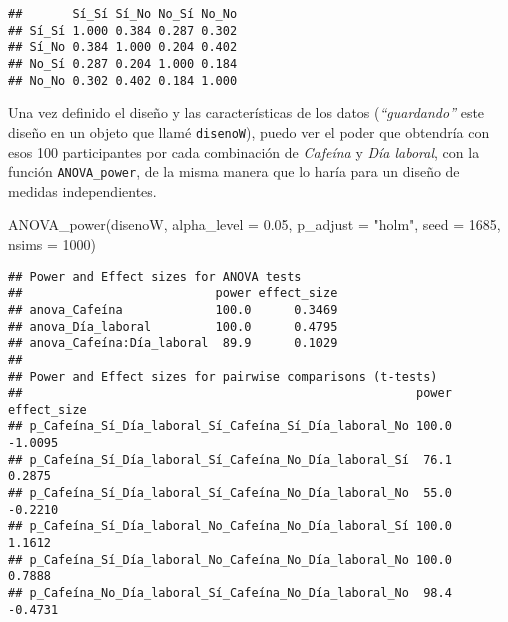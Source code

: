 \documentclass[
]{article}
\newenvironment{Shaded}{\begin{snugshade}}{\end{snugshade}}
\newcommand{\AttributeTok}[1]{\textcolor[rgb]{0.16,0.50,0.73}{#1}}
\newcommand{\DecValTok}[1]{\textcolor[rgb]{0.96,0.45,0.00}{#1}}
\newcommand{\FloatTok}[1]{\textcolor[rgb]{0.96,0.45,0.00}{#1}}
\newcommand{\FunctionTok}[1]{\textcolor[rgb]{0.56,0.27,0.68}{#1}}
\newcommand{\NormalTok}[1]{\textcolor[rgb]{0.81,0.81,0.76}{#1}}
\newcommand{\SpecialCharTok}[1]{\textcolor[rgb]{0.24,0.68,0.91}{#1}}
\newcommand{\StringTok}[1]{\textcolor[rgb]{0.96,0.31,0.31}{#1}}
\begin{document}
\begin{Shaded}
\end{Shaded}

\begin{verbatim}
##       Sí_Sí Sí_No No_Sí No_No
## Sí_Sí 1.000 0.384 0.287 0.302
## Sí_No 0.384 1.000 0.204 0.402
## No_Sí 0.287 0.204 1.000 0.184
## No_No 0.302 0.402 0.184 1.000
\end{verbatim}

Una vez definido el diseño y las características de los datos
(\emph{``guardando''} este diseño en un objeto que llamé
\texttt{disenoW}), puedo ver el poder que obtendría con esos 100
participantes por cada combinación de \emph{Cafeína} y \emph{Día
laboral}, con la función \texttt{ANOVA\_power}, de la misma manera que
lo haría para un diseño de medidas independientes.

\begin{Shaded}
\begin{Highlighting}[]
\FunctionTok{ANOVA\_power}\NormalTok{(disenoW,}
            \AttributeTok{alpha\_level =} \FloatTok{0.05}\NormalTok{,}
            \AttributeTok{p\_adjust =} \StringTok{"holm"}\NormalTok{,}
            \AttributeTok{seed =} \DecValTok{1685}\NormalTok{,}
            \AttributeTok{nsims =} \DecValTok{1000}\NormalTok{)}
\end{Highlighting}
\end{Shaded}

\begin{verbatim}
## Power and Effect sizes for ANOVA tests
##                           power effect_size
## anova_Cafeína             100.0      0.3469
## anova_Día_laboral         100.0      0.4795
## anova_Cafeína:Día_laboral  89.9      0.1029
## 
## Power and Effect sizes for pairwise comparisons (t-tests)
##                                                       power effect_size
## p_Cafeína_Sí_Día_laboral_Sí_Cafeína_Sí_Día_laboral_No 100.0     -1.0095
## p_Cafeína_Sí_Día_laboral_Sí_Cafeína_No_Día_laboral_Sí  76.1      0.2875
## p_Cafeína_Sí_Día_laboral_Sí_Cafeína_No_Día_laboral_No  55.0     -0.2210
## p_Cafeína_Sí_Día_laboral_No_Cafeína_No_Día_laboral_Sí 100.0      1.1612
## p_Cafeína_Sí_Día_laboral_No_Cafeína_No_Día_laboral_No 100.0      0.7888
## p_Cafeína_No_Día_laboral_Sí_Cafeína_No_Día_laboral_No  98.4     -0.4731
\end{verbatim}
\end{document}
